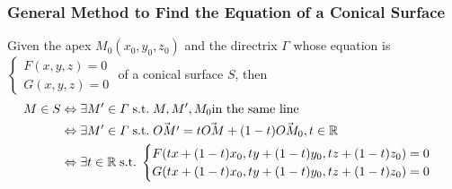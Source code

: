 \documentclass[onecolumn]{ctexart}
\begin{document}
\subsubsection{General Method to Find the Equation of a Conical Surface}
Given the apex $M_0(x_0, y_0, z_0)$ and the directrix $\varGamma$ whose equation is $
\begin{cases}
  F(x, y, z) = 0 \\
  G(x, y, z) = 0
\end{cases}$ of a conical surface $S$, then
\begin{equation}
  \begin{split}
    M \in S &\Leftrightarrow \exists M' \in \varGamma \thickspace \textnormal{s.t.} \thickspace M, M', M_0 \textnormal{in the same line} \\
            &\Leftrightarrow \exists M' \in \varGamma \thickspace \textnormal{s.t.} \thickspace \vec{OM'} = t\vec{OM} + (1 - t)\vec{OM_0}, t \in \mathbb{R} \\
            &\Leftrightarrow \exists t \in \mathbb{R} \thickspace \textnormal{s.t.} \thickspace
            \begin{cases}
              F(tx + (1 - t)x_0, ty + (1 - t)y_0, tz + (1 - t)z_0) = 0 \\
              G(tx + (1 - t)x_0, ty + (1 - t)y_0, tz + (1 - t)z_0) = 0
            \end{cases}
  \end{split}
\end{equation}
\end{document}
